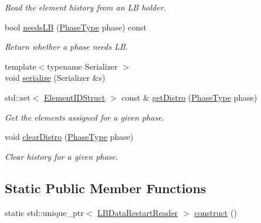 \begin{DoxyCompactItemize}
\begin{DoxyCompactList}\small\item\em Read the element history from an LB holder. \end{DoxyCompactList}\item 
bool \hyperlink{structvt_1_1vrt_1_1collection_1_1balance_1_1_l_b_data_restart_reader_a332e58de26b5d93197d68a4ce3d743fe}{needs\+LB} (\hyperlink{namespacevt_a46ce6733d5cdbd735d561b7b4029f6d7}{Phase\+Type} phase) const
\begin{DoxyCompactList}\small\item\em Return whether a phase needs LB. \end{DoxyCompactList}\item 
{\footnotesize template$<$typename Serializer $>$ }\\void \hyperlink{structvt_1_1vrt_1_1collection_1_1balance_1_1_l_b_data_restart_reader_a26454044882316e639cbfbea61f41c61}{serialize} (Serializer \&s)
\item 
std\+::set$<$ \hyperlink{namespacevt_1_1vrt_1_1collection_1_1balance_a9f5b53fafb270212279a4757d2c4cd28}{Element\+I\+D\+Struct} $>$ const  \& \hyperlink{structvt_1_1vrt_1_1collection_1_1balance_1_1_l_b_data_restart_reader_a5774fc11cdfee784ebea3240ec4b61c7}{get\+Distro} (\hyperlink{namespacevt_a46ce6733d5cdbd735d561b7b4029f6d7}{Phase\+Type} phase)
\begin{DoxyCompactList}\small\item\em Get the elements assigned for a given phase. \end{DoxyCompactList}\item 
void \hyperlink{structvt_1_1vrt_1_1collection_1_1balance_1_1_l_b_data_restart_reader_afc552e9714573f639444437c0b2d6cc1}{clear\+Distro} (\hyperlink{namespacevt_a46ce6733d5cdbd735d561b7b4029f6d7}{Phase\+Type} phase)
\begin{DoxyCompactList}\small\item\em Clear history for a given phase. \end{DoxyCompactList}\end{DoxyCompactItemize}
\subsection*{Static Public Member Functions}
\begin{DoxyCompactItemize}
\item 
static std\+::unique\+\_\+ptr$<$ \hyperlink{structvt_1_1vrt_1_1collection_1_1balance_1_1_l_b_data_restart_reader}{L\+B\+Data\+Restart\+Reader} $>$ \hyperlink{structvt_1_1vrt_1_1collection_1_1balance_1_1_l_b_data_restart_reader_af95b01c9f94865b810acc3c1713dbeae}{construct} ()
\end{DoxyCompactItemize}

